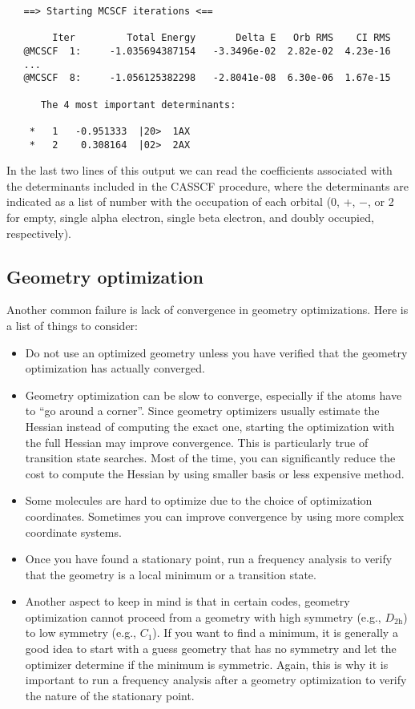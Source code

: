 \documentclass[../Main/chem532-notes.tex]{subfiles}
\begin{document}
\begin{verbatim}
   ==> Starting MCSCF iterations <==

        Iter         Total Energy       Delta E   Orb RMS    CI RMS
   @MCSCF  1:     -1.035694387154   -3.3496e-02  2.82e-02  4.23e-16
   ...
   @MCSCF  8:     -1.056125382298   -2.8041e-08  6.30e-06  1.67e-15
   
      The 4 most important determinants:

    *   1   -0.951333  |20>  1AX
    *   2    0.308164  |02>  2AX
\end{verbatim}
In the last two lines of this output we can read the coefficients associated with the determinants included in the CASSCF procedure, where the determinants are indicated as a list of number with the occupation of each orbital (0, +, $-$, or 2 for empty, single alpha electron, single beta electron, and doubly occupied, respectively).


\subsection{Geometry optimization}

Another common failure is lack of convergence in geometry optimizations. Here is a list of things to consider:
\begin{itemize}
\item Do not use an optimized geometry unless you have verified that the geometry optimization has actually converged.

\item Geometry optimization can be slow to converge,  especially if the atoms have to ``go around a corner''. Since geometry optimizers usually estimate the Hessian instead of computing the exact one, starting the optimization with the full Hessian may improve convergence. This is particularly true of transition state searches. Most of the time, you can significantly reduce the cost to compute the Hessian by using smaller basis or less expensive method.

\item Some molecules are hard to optimize due to the choice of optimization coordinates. Sometimes you can improve convergence by using more complex coordinate systems.

\item Once you have found a stationary point, run a frequency analysis to verify that the geometry is a local minimum or a transition state.

\item Another aspect to keep in mind is that in certain codes, geometry optimization cannot proceed from a geometry with high symmetry (e.g., $D_{2\mathrm{h}}$) to low symmetry (e.g., $C_1$). If you want to find a minimum, it is generally a good idea to start with a guess geometry that has no symmetry and let the optimizer determine if the minimum is symmetric.
Again, this is why it is important to run a frequency analysis after a geometry optimization to verify the nature of the stationary point.
\end{itemize}
\end{document}
